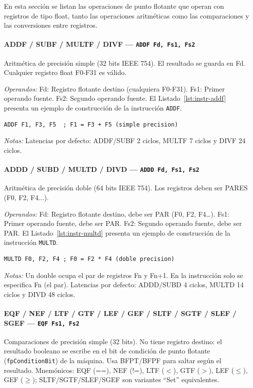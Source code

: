 \documentclass[../main.tex]{subfiles}
\begin{document}
En esta sección se listan las operaciones de punto flotante que operan con registros de tipo float, tanto las operaciones aritméticas como las comparaciones y las conversiones entre registros.

\paragraph*{ADDF / SUBF / MULTF / DIVF --- \texttt{ADDF Fd, Fs1, Fs2}}
Aritmética de precisión simple (32 bits IEEE 754). El resultado se guarda en Fd. Cualquier registro float F0-F31 es válido.

\textit{Operandos:} Fd: Registro flotante destino (cualquiera F0-F31). Fs1: Primer operando fuente. Fs2: Segundo operando fuente.
El Listado~\ref{lst:instr-addf} presenta un ejemplo de construcción de la instrucción \texttt{ADDF}.

\begin{lstlisting}[caption={ADDF},label={lst:instr-addf}]
	ADDF F1, F3, F5  ; F1 = F3 + F5 (simple precision)
\end{lstlisting}
\textit{Notas:} Latencias por defecto: ADDF/SUBF 2 ciclos, MULTF 7 ciclos y DIVF 24 ciclos.

\paragraph*{ADDD / SUBD / MULTD / DIVD --- \texttt{ADDD Fd, Fs1, Fs2}}
Aritmética de precisión doble (64 bits IEEE 754). Los registros deben ser PARES (F0, F2, F4...).

\textit{Operandos:} Fd: Registro flotante destino, debe ser PAR (F0, F2, F4\ldots). Fs1: Primer operando fuente, debe ser PAR. Fs2: Segundo operando fuente, debe ser PAR.
El Listado~\ref{lst:instr-multd} presenta un ejemplo de construcción de la instrucción \texttt{MULTD}.

\begin{lstlisting}[caption={MULTD},label={lst:instr-multd}]
	MULTD F0, F2, F4 ; F0 = F2 * F4 (doble precision)
\end{lstlisting}
\textit{Notas:} Un double ocupa el par de registros Fn y Fn+1. En la instrucción solo se especifica Fn (el par). Latencias por defecto: ADDD/SUBD 4 ciclos, MULTD 14 ciclos y DIVD 48 ciclos.

\paragraph*{EQF / NEF / LTF / GTF / LEF / GEF / SLTF / SGTF / SLEF / SGEF --- \texttt{EQF Fs1, Fs2}}
Comparaciones de precisión simple (32 bits). No tiene registro destino: el resultado booleano se escribe en el bit de condición de punto flotante (\texttt{fpConditionBit}) de la máquina. Usa BFPT/BFPF para saltar según el resultado. Mnemónicos: EQF (==), NEF (!=), LTF ($<$), GTF ($>$), LEF ($\leq$), GEF ($\geq$); SLTF/SGTF/SLEF/SGEF son variantes ``Set'' equivalentes.
\end{document}

